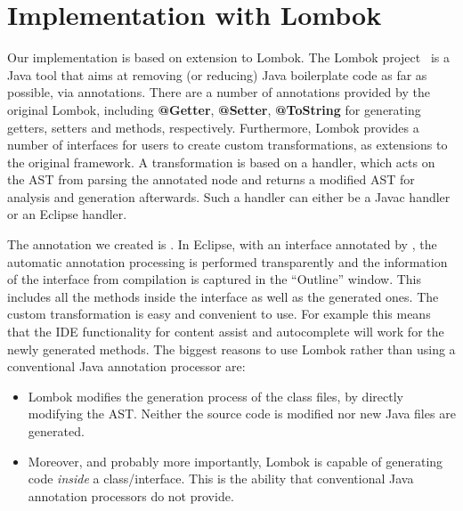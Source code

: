 \section{Implementation with Lombok}

Our implementation is based on extension to Lombok. The Lombok
project~\cite{lombok} is a Java tool that aims at removing (or
reducing) Java boilerplate code as far as possible, via
annotations. There are a number of annotations provided by the
original Lombok, including \textbf{@Getter}, \textbf{@Setter},
\textbf{@ToString} for generating getters, setters and 
methods, respectively.  Furthermore, Lombok provides a number of
interfaces for users to create custom transformations, as extensions
to the original framework.
A transformation is based on a handler, which acts on the AST from
parsing the annotated node and returns a modified AST for analysis and
generation afterwards. Such a handler can either be a Javac handler or
an Eclipse handler.

The annotation we created is \mixin. In Eclipse, with an interface annotated by
\mixin, the automatic annotation processing is performed transparently and the information of
the interface from compilation is captured in the ``Outline'' window. This includes
all the methods inside the interface as well as the generated ones.  The custom
transformation is easy and convenient to use.  For example this means that the
IDE functionality for content assist and autocomplete will work for the newly generated
methods. The biggest reasons to use Lombok rather than using a conventional Java
 annotation processor are:
\begin{itemize}
\item Lombok modifies the generation process of the class files, by directly modifying the AST. 
Neither the source code is modified nor new Java files are generated.
\item Moreover, and probably more importantly, Lombok is capable of generating
  code \emph{inside} a class/interface. This is the ability that conventional
  Java annotation processors do not provide.
\end{itemize}

